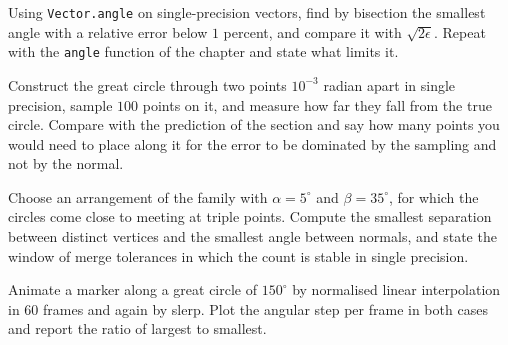 \begin{exercise}
Using \texttt{Vector.angle} on single-precision vectors, find by bisection the smallest angle with a relative error below $1$ percent, and compare it with $\sqrt{2\epsilon}$. Repeat with the \texttt{angle} function of the chapter and state what limits it.
\end{exercise}

\begin{exercise}
Construct the great circle through two points $10^{-3}$ radian apart in single precision, sample $100$ points on it, and measure how far they fall from the true circle. Compare with the prediction of the section and say how many points you would need to place along it for the error to be dominated by the sampling and not by the normal.
\end{exercise}

\begin{exercise}
Choose an arrangement of the family with $\alpha=5^\circ$ and $\beta=35^\circ$, for which the circles come close to meeting at triple points. Compute the smallest separation between distinct vertices and the smallest angle between normals, and state the window of merge tolerances in which the count is stable in single precision.
\end{exercise}

\begin{exercise}
Animate a marker along a great circle of $150^\circ$ by normalised linear interpolation in $60$ frames and again by slerp. Plot the angular step per frame in both cases and report the ratio of largest to smallest.
\end{exercise}
